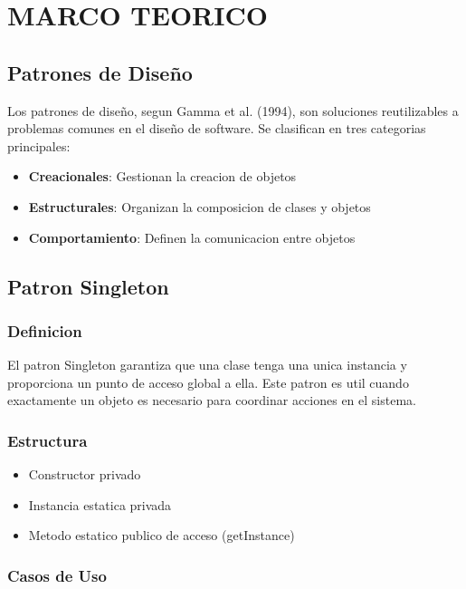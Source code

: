 \documentclass[11pt,a4paper]{article}
\begin{document}
\section{MARCO TEORICO}

\subsection{Patrones de Diseño}

Los patrones de diseño, segun Gamma et al. (1994), son soluciones reutilizables a problemas comunes en el diseño de software. Se clasifican en tres categorias principales:

\begin{itemize}
    \item \textbf{Creacionales}: Gestionan la creacion de objetos
    \item \textbf{Estructurales}: Organizan la composicion de clases y objetos
    \item \textbf{Comportamiento}: Definen la comunicacion entre objetos
\end{itemize}

\subsection{Patron Singleton}

\subsubsection{Definicion}

El patron Singleton garantiza que una clase tenga una unica instancia y proporciona un punto de acceso global a ella. Este patron es util cuando exactamente un objeto es necesario para coordinar acciones en el sistema.

\subsubsection{Estructura}

\begin{itemize}
    \item Constructor privado
    \item Instancia estatica privada
    \item Metodo estatico publico de acceso (getInstance)
\end{itemize}

\subsubsection{Casos de Uso}
\end{document}
